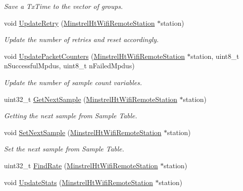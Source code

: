 \begin{DoxyCompactItemize}
\begin{DoxyCompactList}\small\item\em Save a Tx\+Time to the vector of groups. \end{DoxyCompactList}\item 
void \hyperlink{classns3_1_1MinstrelHtWifiManager_a861e370c15601dd71c5bf79cd048b4e4}{Update\+Retry} (\hyperlink{structns3_1_1MinstrelHtWifiRemoteStation}{Minstrel\+Ht\+Wifi\+Remote\+Station} $\ast$station)
\begin{DoxyCompactList}\small\item\em Update the number of retries and reset accordingly. \end{DoxyCompactList}\item 
void \hyperlink{classns3_1_1MinstrelHtWifiManager_a7a73ce35e212586453fb9405c55654a5}{Update\+Packet\+Counters} (\hyperlink{structns3_1_1MinstrelHtWifiRemoteStation}{Minstrel\+Ht\+Wifi\+Remote\+Station} $\ast$station, uint8\+\_\+t n\+Successful\+Mpdus, uint8\+\_\+t n\+Failed\+Mpdus)
\begin{DoxyCompactList}\small\item\em Update the number of sample count variables. \end{DoxyCompactList}\item 
uint32\+\_\+t \hyperlink{classns3_1_1MinstrelHtWifiManager_a953e20a35850da21283123c92db93597}{Get\+Next\+Sample} (\hyperlink{structns3_1_1MinstrelHtWifiRemoteStation}{Minstrel\+Ht\+Wifi\+Remote\+Station} $\ast$station)
\begin{DoxyCompactList}\small\item\em Getting the next sample from Sample Table. \end{DoxyCompactList}\item 
void \hyperlink{classns3_1_1MinstrelHtWifiManager_a2c3213dddeb9e0917073482f732127ed}{Set\+Next\+Sample} (\hyperlink{structns3_1_1MinstrelHtWifiRemoteStation}{Minstrel\+Ht\+Wifi\+Remote\+Station} $\ast$station)
\begin{DoxyCompactList}\small\item\em Set the next sample from Sample Table. \end{DoxyCompactList}\item 
uint32\+\_\+t \hyperlink{classns3_1_1MinstrelHtWifiManager_a06c5d6ae62e898a226ffd6cb0b448038}{Find\+Rate} (\hyperlink{structns3_1_1MinstrelHtWifiRemoteStation}{Minstrel\+Ht\+Wifi\+Remote\+Station} $\ast$station)
\item 
void \hyperlink{classns3_1_1MinstrelHtWifiManager_add9ba12485354ddfaae5a68a90469a92}{Update\+Stats} (\hyperlink{structns3_1_1MinstrelHtWifiRemoteStation}{Minstrel\+Ht\+Wifi\+Remote\+Station} $\ast$station)

\end{DoxyCompactItemize}
